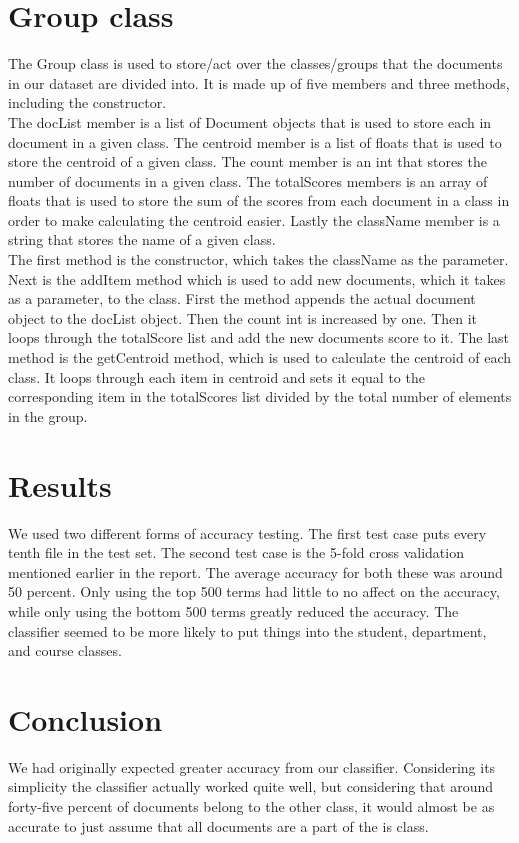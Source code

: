 \documentclass[12pt]{article}
\begin{document}
\section{Group class}
\indent The Group class is used to store/act over the classes/groups that the documents in our dataset are divided into. It is made up of five members and three methods, including the constructor. \\
\indent The docList member is a list of Document objects that is used to store each in document in a given class. The centroid member is a list of floats that is used to store the centroid of a given class. The count member is an int that stores the number of documents in a given class. The totalScores members is an array of floats that is used to store the sum of the scores from each document in a class in order to make calculating the centroid easier. Lastly the className member is a string that stores the name of a given class. \\
\indent The first method is the constructor, which takes the className as the parameter. Next is the addItem method which is used to add new documents, which it takes as a parameter, to the class. First the method appends the actual document object to the docList object. Then the count int is increased by one. Then it loops through the totalScore list and add the new documents score to it. The last method is the getCentroid method, which is used to calculate the centroid of each class. It loops through each item in centroid and sets it equal to the corresponding item in the totalScores list divided by the total number of elements in the group. \\

\section{Results}
We used two different forms of accuracy testing. The first test case puts every tenth file in the test set. The second test case is the 5-fold cross validation mentioned earlier in the report. The average accuracy for both these was around 50 percent. Only using the top 500 terms had little to no affect on the accuracy, while only using the bottom 500 terms greatly reduced the accuracy. The classifier seemed to be more likely to put things into the student, department, and course classes. 

\section{Conclusion}
We had originally expected greater accuracy from our classifier. Considering its simplicity the classifier actually worked quite well, but considering that around forty-five percent of documents belong to the other class, it would almost be as accurate to just assume that all documents are a part of the is class.

\begin{thebibliography}{9}


\end{thebibliography}
\end{document}
